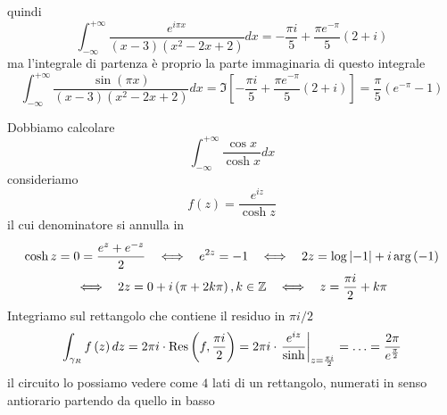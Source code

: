 quindi
\begin{equation*}
\int^{+ \infty}_{- \infty}\frac{e^{i\pi x}}{\left(x - 3\right)\left(x^{2} - 2x + 2\right)} dx = -\frac{\pi i}{5} + \frac{\pi e^{- \pi}}{5}\left(2 + i\right)
\end{equation*}
ma l'integrale di partenza è proprio la parte immaginaria di questo integrale
\begin{equation*}
\int^{+ \infty}_{- \infty}\frac{\sin\left(\pi x\right)}{\left(x - 3\right)\left(x^{2} - 2x + 2\right)} dx = \Im \left[ - \frac{\pi i}{5} + \frac{\pi e^{- \pi}}{5}\left(2 + i\right)\right] = \frac{\pi}{5}\left(e^{- \pi} - 1\right)
\end{equation*}
\Soluzione

Dobbiamo calcolare
\begin{equation*}
\int^{+ \infty}_{- \infty}\frac{\cos x}{\cosh x} dx
\end{equation*}
consideriamo
\begin{equation*}
f\left(z\right) = \frac{e^{iz}}{\cosh z}
\end{equation*}
il cui denominatore si annulla in
\begin{gather*}
\cosh z = 0 = \frac{e^{z} + e^{- z}}{2} \ \ \iff \ \ e^{2z} = - 1\ \ \iff \ \ 2z = \log\left| - 1\right| + i\arg\left(- 1\right)\\
\iff \ \ 2z = 0 + i\left(\pi + 2k\pi \right), k\in \ZZ  \ \ \iff \ \ z = \frac{\pi i}{2} + k\pi 
\end{gather*}
Integriamo sul rettangolo che contiene il residuo in $\pi i/2$
\begin{equation*}
\int_{\gamma_{R}} f\left(z\right) dz = 2\pi i \cdot \operatorname{Res} \left(f, \frac{\pi i}{2}\right) = 2\pi i \cdot \left. \frac{e^{iz}}{\sinh}\right|_{z = \frac{\pi i}{2}} = \dotsc = \frac{2\pi}{e^{\frac{\pi}{2}}}
\end{equation*}
il circuito lo possiamo vedere come $4$ lati di un rettangolo, numerati in senso antiorario partendo da quello in basso


